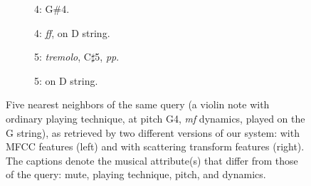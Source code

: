 \begin{figure}
        \begin{subfigure}{0.20\textwidth}
                \centering
                \caption*{4: G\#4.}
                \label{fig:Vn-ord-Gsh4-mf-4c}
        \end{subfigure}%
        \begin{subfigure}{0.20\textwidth}
                \centering
                \caption*{4: \emph{ff}, on D string.}
                \label{fig:Vn-ord-G4-ff-3c}
        \end{subfigure}%

        \begin{subfigure}{0.20\textwidth}
                \centering
                \caption*{5: \emph{tremolo}, C$\sharp$5, \emph{pp}.}
                \label{fig:Vn-trem-Csh5-pp-4c}
        \end{subfigure}%
        \begin{subfigure}{0.20\textwidth}
                \centering
                \caption*{5: on D string.}
                \label{fig:Vn-ord-G4-mf-3c}
        \end{subfigure}%

        \caption{Five nearest neighbors of the same query (a violin note with ordinary playing technique, at pitch G4, \emph{mf} dynamics, played on the G string), as retrieved by two different versions of our system: with MFCC features (left) and with scattering transform features (right). The captions denote the musical attribute(s) that differ from those of the query: mute, playing technique, pitch, and dynamics.
}\label{fig:demo-ordinary}
\end{figure}



